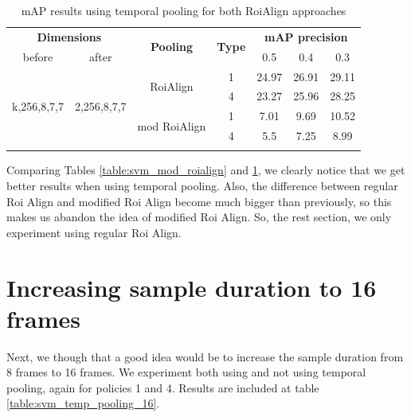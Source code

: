 \documentclass{report}
\begin{document}
\begin{center}
\begin{longtable}{||c | c| c| c||c c c||}

  \hline
 \multicolumn{2}{||c|}{\textbf{Dimensions}} & \multirow{2}{*}{\textbf{Pooling}} &\multirow{2}{*}{ \textbf{Type}} &\multicolumn{3}{|c||}{\textbf{mAP precision}}\\

  before & after & {} & {} & 0.5 &  0.4 & 0.3\\
  \hline   \hline

  \multirow{4}{*}{k,256,8,7,7} & \multirow{4}{*}{2,256,8,7,7} & \multirow{2}{*}{RoiAlign}  & 1 & 24.97 & 26.91 & 29.11 \\
  \cline{4-7}
  {} & {} & {} & 4 &  23.27 & 25.96 & 28.25 \\
  \cline{3-7}
  {} & {} & \multirow{2}{*}{mod RoiAlign} & 1 & 7.01 & 9.69 & 10.52 \\
  \cline{4-7}
  {} & {} & {} & 4 & 5.5 & 7.25 & 8.99 \\
  \hline

  \caption{mAP results using temporal pooling for both RoiAlign approaches}
  \label{table:svm_temp_pooling}
\end{longtable} 
\end{center}

Comparing Tables \ref{table:svm_mod_roialign} and \ref{table:svm_temp_pooling}, we clearly notice that we get better results when
using temporal pooling. Also, the difference between regular Roi Align and modified Roi Align become much bigger than previously,
so this makes us abandon the idea of modified Roi Align. So, the rest section, we only experiment using regular Roi Align.

\section{Increasing sample duration to 16 frames}

Next, we though that a good idea would be to increase the sample duration from 8 frames to 16 frames. We experiment both using and not
using temporal pooling, again for policies 1 and 4. Results are included at table \ref{table:svm_temp_pooling_16}. 
\end{document}
